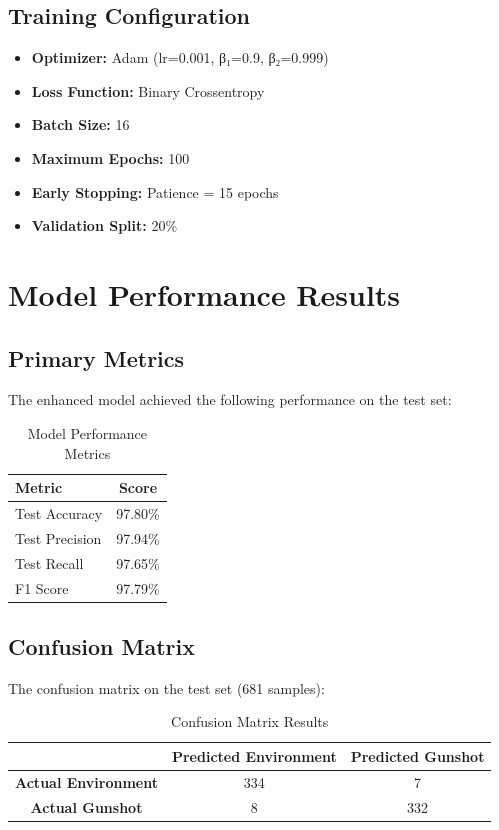 \documentclass[12pt]{article}
\begin{document}
\subsection{Training Configuration}
\begin{itemize}
    \item \textbf{Optimizer:} Adam (lr=0.001, β₁=0.9, β₂=0.999)
    \item \textbf{Loss Function:} Binary Crossentropy
    \item \textbf{Batch Size:} 16
    \item \textbf{Maximum Epochs:} 100
    \item \textbf{Early Stopping:} Patience = 15 epochs
    \item \textbf{Validation Split:} 20\%
\end{itemize}

\section{Model Performance Results}

\subsection{Primary Metrics}
The enhanced model achieved the following performance on the test set:

\begin{table}[H]
\centering
\caption{Model Performance Metrics}
\begin{tabular}{@{}lc@{}}
\toprule
\textbf{Metric} & \textbf{Score} \\
\midrule
Test Accuracy & 97.80\% \\
Test Precision & 97.94\% \\
Test Recall & 97.65\% \\
F1 Score & 97.79\% \\
\bottomrule
\end{tabular}
\end{table}

\subsection{Confusion Matrix}
The confusion matrix on the test set (681 samples):

\begin{table}[H]
\centering
\caption{Confusion Matrix Results}
\begin{tabular}{@{}ccc@{}}
\toprule
& \textbf{Predicted Environment} & \textbf{Predicted Gunshot} \\
\midrule
\textbf{Actual Environment} & 334 & 7 \\
\textbf{Actual Gunshot} & 8 & 332 \\
\bottomrule
\end{tabular}
\end{table}
\end{document}
